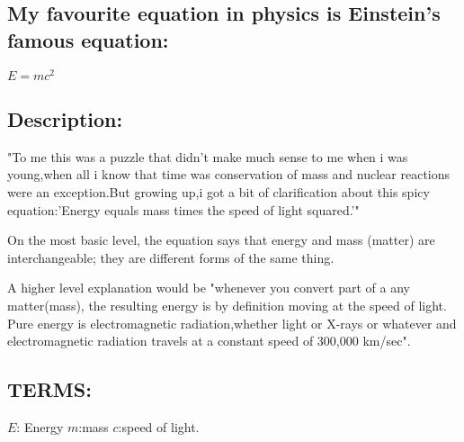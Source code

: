 \subsection{My favourite equation in physics is Einstein's famous equation:} 

$E=mc^2$

\subsection{Description:}
"To me this was a puzzle that didn't make much sense to me when i was young,when all i know that time was conservation of mass and nuclear reactions were an exception.But growing up,i got a bit of clarification about this spicy equation:'Energy equals mass times the speed of light squared.'"

On the most basic level, the equation says that energy and mass (matter) are interchangeable; they are different forms of the same thing.

A higher level explanation would be "whenever you convert part of a any matter(mass), the resulting energy is by definition moving at the speed of light. Pure energy is electromagnetic radiation,whether light or X-rays or whatever and electromagnetic radiation travels at a constant speed of 300,000 km/sec".

\subsection{TERMS:}
                       $E$: Energy
                       $m$:mass 
                       $c$:speed of light.
